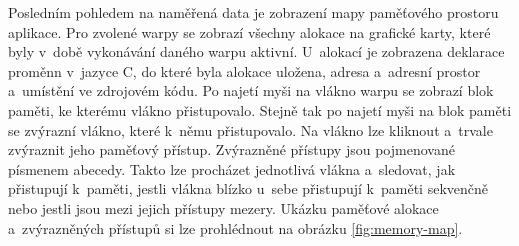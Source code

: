 Posledním pohledem na naměřená data je zobrazení mapy paměťového prostoru aplikace. Pro zvolené warpy se zobrazí všechny alokace na grafické karty, které byly v~době vykonávání daného warpu aktivní. U~alokací je zobrazena deklarace proměnn v~jazyce C, do které byla alokace uložena, adresa a~adresní prostor a~umístění ve zdrojovém kódu. Po najetí myši na vlákno warpu se zobrazí blok paměti, ke kterému vlákno přistupovalo. Stejně tak po najetí myši na blok paměti se zvýrazní vlákno, které k~němu přistupovalo. Na vlákno lze kliknout a~trvale zvýraznit jeho paměťový přístup. Zvýrazněné přístupy jsou pojmenované písmenem abecedy. Takto lze procházet jednotlivá vlákna a~sledovat, jak přistupují k~paměti, jestli vlákna blízko u~sebe přistupují k~paměti sekvenčně nebo jestli jsou mezi jejich přístupy mezery. Ukázku paměťové alokace a~zvýrazněných přístupů si lze prohlédnout na obrázku \ref{fig:memory-map}. 


